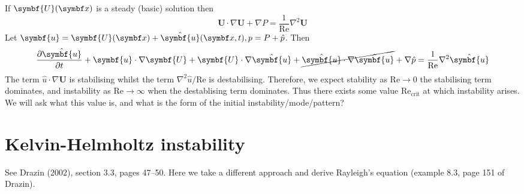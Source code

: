 \documentclass{jknotes}
\renewcommand{\u}{\symbf{u}}
\begin{document}
If $\symbf{U}(\x)$ is a steady (basic) solution then
\begin{equation}
	\symbf{U}\cdot\nabla\symbf{U} + \nabla P = \frac{1}{\text{Re}} \nabla^2
	\symbf{U}
\end{equation}
Let $\u = \symbf{U}(\x) + \hat{\u}(\x,t), p = P + \hat{p}$. Then
\begin{equation}
	\frac{\partial \hat{\u}}{\partial t} + \u \cdot \nabla \symbf{U} +
	\symbf{U} \cdot \nabla \hat{\u} + \cancel{\hat{\u}\cdot\nabla\hat{\u}} +
	\nabla \hat{p} = \frac{1}{\text{Re}} \nabla^2 \hat{\u}
\end{equation}
The term $\hat{u}\cdot\nabla \symbf{U}$ is stabilising whilst the term
$\nabla^2 \hat{u} / \text{Re}$ is destabilising. Therefore, we expect stability
as $\text{Re} \to 0$ the stabilising term dominates, and instability as
$\text{Re} \to \infty$ when the destablising term dominates. Thus there exists
some value $\text{Re}_{\text{crit}}$ at which instability arises. We will ask
what this value is, and what is the form of the initial
instability/mode/pattern?

\section{Kelvin-Helmholtz instability}
See Drazin (2002), section 3.3, pages 47--50. Here we take a different approach
and derive Rayleigh's equation (example 8.3, page 151 of Drazin). 

\begin{center}
\end{center}
\end{document}
